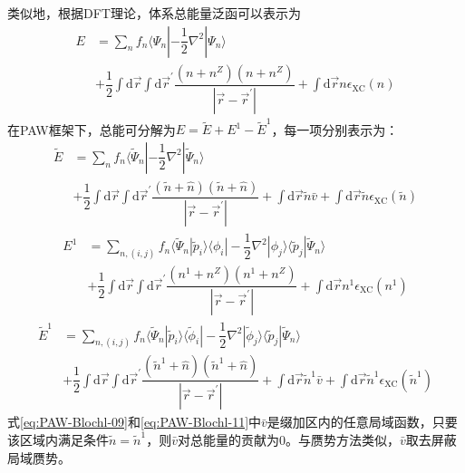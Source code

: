 类似地，根据\textrm{DFT}理论，体系总能量泛函可以表示为
\begin{equation}
	\begin{aligned}
		E&=\sum_nf_n\langle\Psi_n|-\dfrac12\nabla^2|\Psi_n\rangle\\
		 &+\dfrac12\int\mathrm{d}\vec r\int\mathrm{d}\vec r^{\prime}\dfrac{(n+n^Z)(n+n^Z)}{|\vec r-\vec r^{\prime}|}+\int\mathrm{d}\vec r n\epsilon_{\mathrm{XC}}(n)
	\end{aligned}
	\label{eq:PAW-Blochl-08}
\end{equation}
在\textrm{PAW}框架下，总能可分解为$E=\tilde E+E^1-\tilde E^1$，每一项分别表示为：
\begin{equation}
	\begin{aligned}
		\tilde E&=\sum_nf_n\langle\tilde\Psi_n|-\dfrac12\nabla^2|\tilde\Psi_n\rangle\\
		 &+\dfrac12\int\mathrm{d}\vec r\int\mathrm{d}\vec r^{\prime}\dfrac{(\tilde n+\hat n)(\tilde n+\hat n)}{|\vec r-\vec r^{\prime}|}+\int\mathrm{d}\vec r \tilde n\bar v+\int\mathrm{d}\vec r \tilde n\epsilon_{\mathrm{XC}}(\tilde n)
 	\end{aligned}
	\label{eq:PAW-Blochl-09}
\end{equation}
\begin{equation}
	\begin{aligned}
		E^1&=\sum_{n,(i,j)}f_n\langle\tilde\Psi_n|\tilde p_i\rangle\langle\phi_i|-\dfrac12\nabla^2|\phi_j\rangle\langle\tilde p_j|\tilde\Psi_n\rangle\\
		 &+\dfrac12\int\mathrm{d}\vec r\int\mathrm{d}\vec r^{\prime}\dfrac{(n^1+n^Z)(n^1+n^Z)}{|\vec r-\vec r^{\prime}|}+\int\mathrm{d}\vec r n^1\epsilon_{\mathrm{XC}}(n^1)
 	\end{aligned}
	\label{eq:PAW-Blochl-10}
\end{equation}
\begin{equation}
	\begin{aligned}
		\tilde E^1&=\sum_{n,(i,j)}f_n\langle\tilde\Psi_n|\tilde p_i\rangle\langle\tilde\phi_i|-\dfrac12\nabla^2|\tilde\phi_j\rangle\langle\tilde p_j|\tilde\Psi_n\rangle\\
		 &+\dfrac12\int\mathrm{d}\vec r\int\mathrm{d}\vec r^{\prime}\dfrac{(\tilde n^1+\hat n)(\tilde n^1+\hat n)}{|\vec r-\vec r^{\prime}|}+\int\mathrm{d}\vec r \tilde n^1\bar v+\int\mathrm{d}\vec r \tilde n^1\epsilon_{\mathrm{XC}}(\tilde n^1)
 	\end{aligned}
	\label{eq:PAW-Blochl-11}
\end{equation}
式\eqref{eq:PAW-Blochl-09}和\eqref{eq:PAW-Blochl-11}中$\bar v$是缀加区内的任意局域函数，只要该区域内满足条件$\tilde n=\tilde n^1$，则$\bar v$对总能量的贡献为0。与赝势方法类似，$\bar v$取去屏蔽局域赝势。

